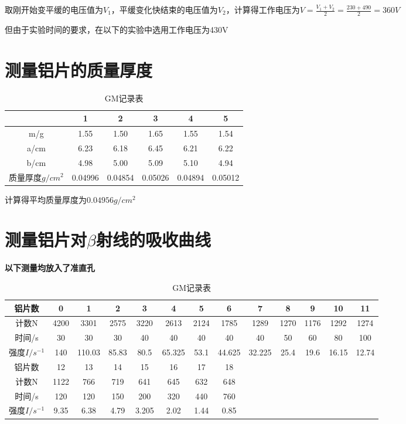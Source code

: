 \documentclass[a4paper,UTF8]{ctexart}
\begin{document}
取刚开始变平缓的电压值为$V_1$，平缓变化快结束的电压值为$V_2$，计算得工作电压为$V = \frac{V_1+V_2}{2} = \frac{230+490}{2} = 360 V$

但由于实验时间的要求，在以下的实验中选用工作电压为430V

\section{测量铝片的质量厚度}

\begin{table}[H]
    \centering
    \begin{tabular}{|c|c|c|c|c|c|}
    \hline
        ~ & 1 & 2 & 3 & 4 & 5 \\ \hline
        m/g & 1.55 & 1.50 & 1.65 & 1.55 & 1.54 \\ \hline
        a/cm & 6.23 & 6.18 & 6.45 & 6.21 & 6.22 \\ \hline
        b/cm & 4.98 & 5.00 & 5.09 & 5.10 & 4.94 \\ \hline
        质量厚度$g/cm^2$ & 0.04996 & 0.04854 & 0.05026 & 0.04894 & 0.05012 \\ \hline
    \end{tabular}
    \caption{GM记录表}
\end{table}

计算得平均质量厚度为$0.04956 g/cm^2$

\section{测量铝片对$\beta$射线的吸收曲线}

{\bfseries{\color{red}{注：}}以下测量均放入了准直孔}

\begin{table}[H]
    \centering
    \begin{tabular}{|c|c|c|c|c|c|c|c|c|c|c|c|c|}
    \hline
        铝片数 & 0 & 1 & 2 & 3 & 4 & 5 & 6 & 7 & 8 & 9 & 10 & 11 \\ \hline
        计数N & 4200 & 3301 & 2575 & 3220 & 2613 & 2124 & 1785 & 1289 & 1270 & 1176 & 1292 & 1274 \\ \hline
        时间/s & 30 & 30 & 30 & 40 & 40 & 40 & 40 & 40 & 50 & 60 & 80 & 100 \\ \hline
        强度$I/s^{-1}$ & 140 & 110.03 & 85.83 & 80.5 & 65.325 & 53.1 & 44.625 & 32.225 & 25.4 & 19.6 & 16.15 & 12.74 \\ \hline
        铝片数 & 12 & 13 & 14 & 15 & 16 & 17 & 18 & ~ & ~ & ~ & ~ & ~ \\ \hline
        计数N & 1122 & 766 & 719 & 641 & 645 & 632 & 648 & ~ & ~ & ~ & ~ & ~ \\ \hline
        时间/s & 120 & 120 & 150 & 200 & 320 & 440 & 760 & ~ & ~ & ~ & ~ & ~ \\ \hline
        强度$I/s^{-1}$ & 9.35 & 6.38 & 4.79 & 3.205 & 2.02 & 1.44 & 0.85 & ~ & ~ & ~ & ~ & ~ \\ \hline
    \end{tabular}
    \caption{GM记录表}
\end{table}
\end{document}
